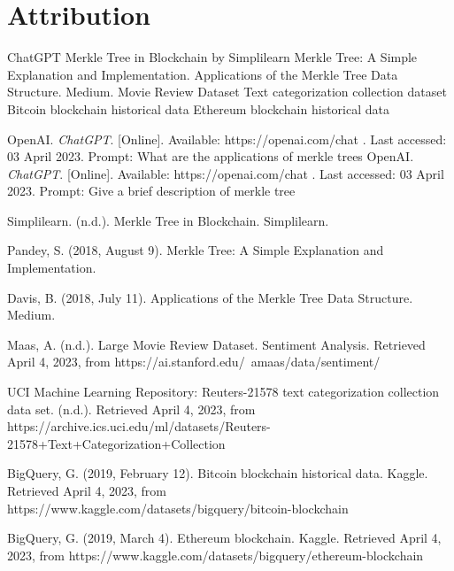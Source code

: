 \documentclass{article}
\begin{document}
\section{Attribution}
ChatGPT
\newline
Merkle Tree in Blockchain by Simplilearn
\newline
Merkle Tree: A Simple Explanation and Implementation. 
\newline
Applications of the Merkle Tree Data Structure. Medium. 
\newline
Movie Review Dataset
\newline
Text categorization collection dataset
\newline
Bitcoin blockchain historical data
\newline
Ethereum blockchain historical data

  \begin{thebibliography}{9}
  OpenAI. \textit{ChatGPT}. [Online]. Available: https://openai.com/chat . Last accessed: 03 April 2023. Prompt: What are the applications of merkle trees
  OpenAI. \textit{ChatGPT}. [Online]. Available: https://openai.com/chat . Last accessed: 03 April 2023. Prompt: Give a brief description of merkle tree

  Simplilearn. (n.d.). Merkle Tree in Blockchain. Simplilearn. 

  Pandey, S. (2018, August 9). Merkle Tree: A Simple Explanation and Implementation. 

  Davis, B. (2018, July 11). Applications of the Merkle Tree Data Structure. Medium. 

  Maas, A. (n.d.). Large Movie Review Dataset. Sentiment Analysis. Retrieved April 4, 2023, from https://ai.stanford.edu/~amaas/data/sentiment/ 

  UCI Machine Learning Repository: Reuters-21578 text categorization collection data set. (n.d.). Retrieved April 4, 2023, from https://archive.ics.uci.edu/ml/datasets/Reuters-21578+Text+Categorization+Collection 

  BigQuery, G. (2019, February 12). Bitcoin blockchain historical data. Kaggle. Retrieved April 4, 2023, from https://www.kaggle.com/datasets/bigquery/bitcoin-blockchain

  BigQuery, G. (2019, March 4). Ethereum blockchain. Kaggle. Retrieved April 4, 2023, from https://www.kaggle.com/datasets/bigquery/ethereum-blockchain

  \end{thebibliography}
\end{document}

